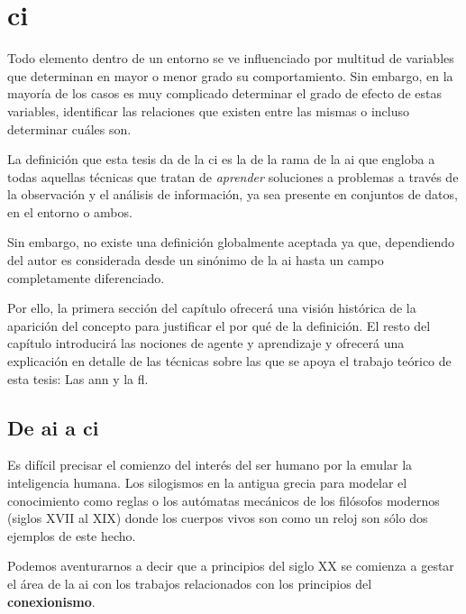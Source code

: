 \chapter{\acrlong{ci}}
\label{ch:sota-ci}

Todo elemento dentro de un entorno se ve influenciado por multitud de variables que determinan en mayor o menor grado su comportamiento. Sin embargo, en la mayoría de los casos es muy complicado determinar el grado de efecto de estas variables, identificar las relaciones que existen entre las mismas o incluso determinar cuáles son.

La definición que esta tesis da de la \acrfull{ci} es la de la rama de la \acrfull{ai} que engloba a todas aquellas técnicas que tratan de \textit{aprender} soluciones a problemas a través de la observación y el análisis de información, ya sea presente en conjuntos de datos, en el entorno o ambos.

Sin embargo, no existe una definición globalmente aceptada ya que, dependiendo del autor es considerada desde un sinónimo de la \gls{ai} hasta un campo completamente diferenciado.

Por ello, la primera sección del capítulo ofrecerá una visión histórica de la aparición del concepto para justificar el por qué de la definición. El resto del capítulo introducirá las nociones de agente y aprendizaje y ofrecerá una explicación en detalle de las técnicas sobre las que se apoya el trabajo teórico de esta tesis: Las \acrlong{ann} y la \acrlong{fl}.

\section{De \acrlong{ai} a \acrlong{ci}}

Es difícil precisar el comienzo del interés del ser humano por la emular la inteligencia humana. Los silogismos en la antigua grecia para modelar el conocimiento como reglas o los autómatas mecánicos de los filósofos modernos (siglos XVII al XIX) donde los cuerpos vivos son como un reloj son sólo dos ejemplos de este hecho.

Podemos aventurarnos a decir que a principios del siglo XX se comienza a gestar el área de la \gls{ai} con los trabajos relacionados con los principios del \textbf{conexionismo}.

